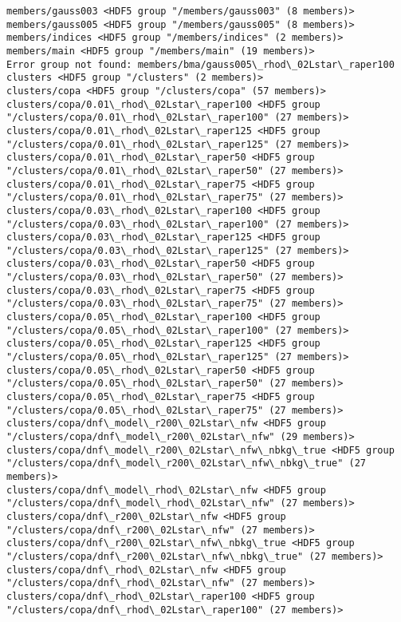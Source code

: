 \documentclass[11pt]{article}
\begin{document}
\begin{Verbatim}[commandchars=\\\{\}]
members/gauss003 <HDF5 group "/members/gauss003" (8 members)>
members/gauss005 <HDF5 group "/members/gauss005" (8 members)>
members/indices <HDF5 group "/members/indices" (2 members)>
members/main <HDF5 group "/members/main" (19 members)>
Error group not found: members/bma/gauss005\_rhod\_02Lstar\_raper100
clusters <HDF5 group "/clusters" (2 members)>
clusters/copa <HDF5 group "/clusters/copa" (57 members)>
clusters/copa/0.01\_rhod\_02Lstar\_raper100 <HDF5 group "/clusters/copa/0.01\_rhod\_02Lstar\_raper100" (27 members)>
clusters/copa/0.01\_rhod\_02Lstar\_raper125 <HDF5 group "/clusters/copa/0.01\_rhod\_02Lstar\_raper125" (27 members)>
clusters/copa/0.01\_rhod\_02Lstar\_raper50 <HDF5 group "/clusters/copa/0.01\_rhod\_02Lstar\_raper50" (27 members)>
clusters/copa/0.01\_rhod\_02Lstar\_raper75 <HDF5 group "/clusters/copa/0.01\_rhod\_02Lstar\_raper75" (27 members)>
clusters/copa/0.03\_rhod\_02Lstar\_raper100 <HDF5 group "/clusters/copa/0.03\_rhod\_02Lstar\_raper100" (27 members)>
clusters/copa/0.03\_rhod\_02Lstar\_raper125 <HDF5 group "/clusters/copa/0.03\_rhod\_02Lstar\_raper125" (27 members)>
clusters/copa/0.03\_rhod\_02Lstar\_raper50 <HDF5 group "/clusters/copa/0.03\_rhod\_02Lstar\_raper50" (27 members)>
clusters/copa/0.03\_rhod\_02Lstar\_raper75 <HDF5 group "/clusters/copa/0.03\_rhod\_02Lstar\_raper75" (27 members)>
clusters/copa/0.05\_rhod\_02Lstar\_raper100 <HDF5 group "/clusters/copa/0.05\_rhod\_02Lstar\_raper100" (27 members)>
clusters/copa/0.05\_rhod\_02Lstar\_raper125 <HDF5 group "/clusters/copa/0.05\_rhod\_02Lstar\_raper125" (27 members)>
clusters/copa/0.05\_rhod\_02Lstar\_raper50 <HDF5 group "/clusters/copa/0.05\_rhod\_02Lstar\_raper50" (27 members)>
clusters/copa/0.05\_rhod\_02Lstar\_raper75 <HDF5 group "/clusters/copa/0.05\_rhod\_02Lstar\_raper75" (27 members)>
clusters/copa/dnf\_model\_r200\_02Lstar\_nfw <HDF5 group "/clusters/copa/dnf\_model\_r200\_02Lstar\_nfw" (29 members)>
clusters/copa/dnf\_model\_r200\_02Lstar\_nfw\_nbkg\_true <HDF5 group "/clusters/copa/dnf\_model\_r200\_02Lstar\_nfw\_nbkg\_true" (27 members)>
clusters/copa/dnf\_model\_rhod\_02Lstar\_nfw <HDF5 group "/clusters/copa/dnf\_model\_rhod\_02Lstar\_nfw" (27 members)>
clusters/copa/dnf\_r200\_02Lstar\_nfw <HDF5 group "/clusters/copa/dnf\_r200\_02Lstar\_nfw" (27 members)>
clusters/copa/dnf\_r200\_02Lstar\_nfw\_nbkg\_true <HDF5 group "/clusters/copa/dnf\_r200\_02Lstar\_nfw\_nbkg\_true" (27 members)>
clusters/copa/dnf\_rhod\_02Lstar\_nfw <HDF5 group "/clusters/copa/dnf\_rhod\_02Lstar\_nfw" (27 members)>
clusters/copa/dnf\_rhod\_02Lstar\_raper100 <HDF5 group "/clusters/copa/dnf\_rhod\_02Lstar\_raper100" (27 members)>

\end{Verbatim}
\end{document}
